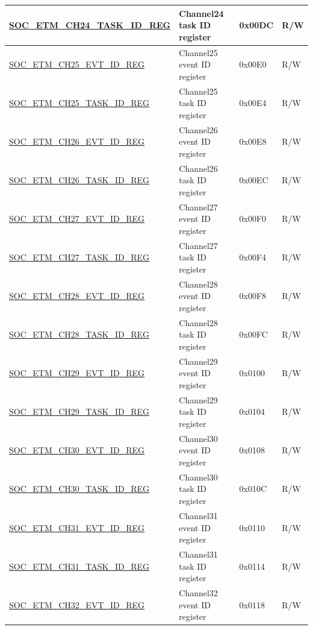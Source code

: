 \begin{longtable}{ | p{6cm} | p{6.2cm} | p{1.3cm} | p{2cm} | }
\hyperref[regdesc:SOCETMCHNTASKIDREG]{SOC\_ETM\_CH24\_TASK\_ID\_REG} & Channel24 task ID register & 0x00DC & R/W \\ \hline
\hyperref[regdesc:SOCETMCHNEVTIDREG]{SOC\_ETM\_CH25\_EVT\_ID\_REG} & Channel25 event ID register & 0x00E0 & R/W \\ \hline
\hyperref[regdesc:SOCETMCHNTASKIDREG]{SOC\_ETM\_CH25\_TASK\_ID\_REG} & Channel25 task ID register & 0x00E4 & R/W \\ \hline
\hyperref[regdesc:SOCETMCHNEVTIDREG]{SOC\_ETM\_CH26\_EVT\_ID\_REG} & Channel26 event ID register & 0x00E8 & R/W \\ \hline
\hyperref[regdesc:SOCETMCHNTASKIDREG]{SOC\_ETM\_CH26\_TASK\_ID\_REG} & Channel26 task ID register & 0x00EC & R/W \\ \hline
\hyperref[regdesc:SOCETMCHNEVTIDREG]{SOC\_ETM\_CH27\_EVT\_ID\_REG} & Channel27 event ID register & 0x00F0 & R/W \\ \hline
\hyperref[regdesc:SOCETMCHNTASKIDREG]{SOC\_ETM\_CH27\_TASK\_ID\_REG} & Channel27 task ID register & 0x00F4 & R/W \\ \hline
\hyperref[regdesc:SOCETMCHNEVTIDREG]{SOC\_ETM\_CH28\_EVT\_ID\_REG} & Channel28 event ID register & 0x00F8 & R/W \\ \hline
\hyperref[regdesc:SOCETMCHNTASKIDREG]{SOC\_ETM\_CH28\_TASK\_ID\_REG} & Channel28 task ID register & 0x00FC & R/W \\ \hline
\hyperref[regdesc:SOCETMCHNEVTIDREG]{SOC\_ETM\_CH29\_EVT\_ID\_REG} & Channel29 event ID register & 0x0100 & R/W \\ \hline
\hyperref[regdesc:SOCETMCHNTASKIDREG]{SOC\_ETM\_CH29\_TASK\_ID\_REG} & Channel29 task ID register & 0x0104 & R/W \\ \hline
\hyperref[regdesc:SOCETMCHNEVTIDREG]{SOC\_ETM\_CH30\_EVT\_ID\_REG} & Channel30 event ID register & 0x0108 & R/W \\ \hline
\hyperref[regdesc:SOCETMCHNTASKIDREG]{SOC\_ETM\_CH30\_TASK\_ID\_REG} & Channel30 task ID register & 0x010C & R/W \\ \hline
\hyperref[regdesc:SOCETMCHNEVTIDREG]{SOC\_ETM\_CH31\_EVT\_ID\_REG} & Channel31 event ID register & 0x0110 & R/W \\ \hline
\hyperref[regdesc:SOCETMCHNTASKIDREG]{SOC\_ETM\_CH31\_TASK\_ID\_REG} & Channel31 task ID register & 0x0114 & R/W \\ \hline
\hyperref[regdesc:SOCETMCHNEVTIDREG]{SOC\_ETM\_CH32\_EVT\_ID\_REG} & Channel32 event ID register & 0x0118 & R/W \\ \hline

\end{longtable}
